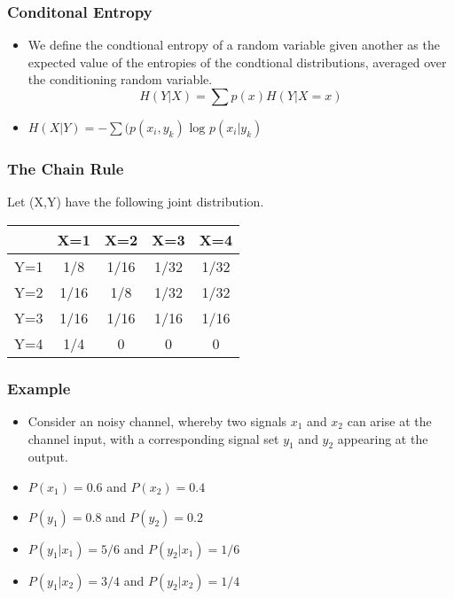 \begin{frame}
\frametitle{Conditonal Entropy}
\begin{itemize}
\item We define the condtional entropy of a random variable given another as the expected value of the entropies of the condtional distributions, averaged over the conditioning random variable.
\[ H(Y|X) = \sum p(x)H(Y|X=x) \]
\item $H(X|Y) = -\sum ( p(x_i,y_k)\mbox{ log }p(x_i|y_k)$
\end{itemize}
\end{frame}




\begin{frame}

\frametitle{The Chain Rule}
Let (X,Y) have the following joint distribution.
\begin{center}
\begin{tabular}{|c||c|c|c|c|}\hline
& X=1 &X=2 &X=3 &X=4 \\ \hline \hline
Y=1& 1/8  & 1/16 & 1/32 & 1/32 \\ \hline
Y=2& 1/16 & 1/8  & 1/32 & 1/32 \\ \hline
Y=3& 1/16 & 1/16 & 1/16 & 1/16 \\ \hline
Y=4& 1/4  & 0       & 0       & 0 \\ \hline
\end{tabular}
\end{center}

\end{frame}

\begin{frame}
\frametitle{Example}
\begin{itemize}
\item Consider an noisy channel,  whereby two signals $x_1$ and $x_2$ can arise at the channel input, with a corresponding signal set $y_1$ and $y_2$ appearing at the output.
\item $P(x_1) = 0.6$ and $P(x_2) = 0.4$
\item $P(y_1)= 0.8$ and $P(y_2) = 0.2$
\item $P(y_1|x_1) = 5/6$ and  $P(y_2|x_1) = 1/6$
\item $P(y_1|x_2) = 3/4$ and  $P(y_2|x_2) = 1/4$
\end{itemize}
\end{frame}

